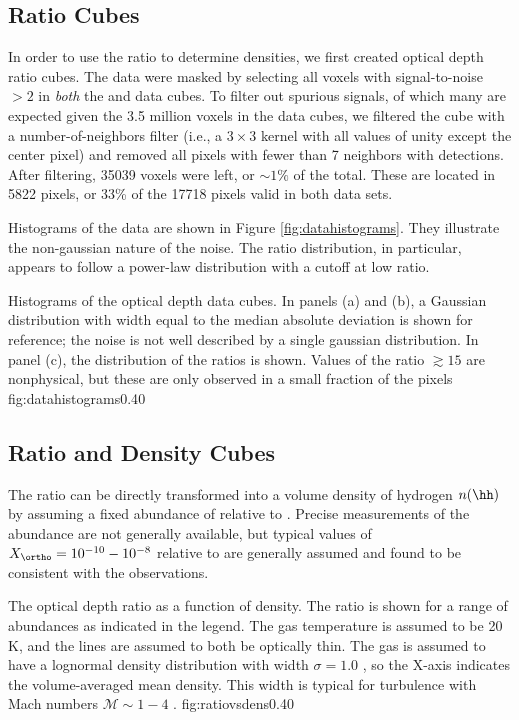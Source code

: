 \subsection{Ratio Cubes}
In order to use the \formaldehyde ratio to determine densities, we first
created optical depth ratio cubes.  The data were masked by selecting all
voxels with signal-to-noise $>2$ in  \emph{both} the \oneone and \twotwo data
cubes.  To filter out spurious signals, of which many are expected given the
3.5 million voxels in the data cubes, we filtered the cube with a
number-of-neighbors filter (i.e., a $3\times3$ kernel with all values of unity
except the center pixel) and removed all pixels with fewer than 7 neighbors
with detections.  After filtering, 35039 voxels were left, or $\sim 1\%$ of the
total.  These are located in 5822 pixels, or 33\% of the 17718 pixels valid in
both data sets.

Histograms of the data are shown in Figure \ref{fig:datahistograms}.  They
illustrate the non-gaussian nature of the noise.  The ratio distribution, in
particular, appears to follow a power-law distribution with a cutoff at low
ratio.

{Histograms of the optical depth data cubes.  In panels (a) and (b),
a Gaussian distribution with width equal to the median absolute deviation
is shown for reference; the noise is not well described by a single gaussian
distribution.  In panel (c), the distribution of the ratios is shown.
Values of the ratio $\gtrsim15$ are nonphysical, but these are only observed
in a small fraction of the pixels}
{fig:datahistograms}{0.4}{0}


\subsection{Ratio and Density Cubes}
The \formaldehyde ratio can be directly transformed into a volume density of
hydrogen $n(\hh)$ by assuming a fixed abundance of \formaldehyde relative to
\hh.  Precise measurements of the \formaldehyde abundance are not generally
available, but typical values of $X_{\ortho} = 10^{-10}-10^{-8}$ relative to
\hh are generally assumed \citep{Mangum1993a, Ginsburg2011a, Ginsburg2013a,
Ao2013a} and found to be consistent with the observations.

{The optical depth ratio as a function of \hh density.  The ratio is shown for
a range of \formaldehyde abundances as indicated in the legend.
The gas temperature is assumed to be 20 K, and the \formaldehyde lines
are assumed to both be optically thin.  The gas is assumed to have a
lognormal density distribution with width $\sigma=1.0$ \citep[see ][ for
details]{Ginsburg2013a}, so the X-axis indicates the volume-averaged
mean \hh density.  This width is typical for turbulence with Mach numbers
$\mathcal{M}\sim1-4$ \citep{Federrath2008a}.}
{fig:ratiovsdens}{0.4}{0}


